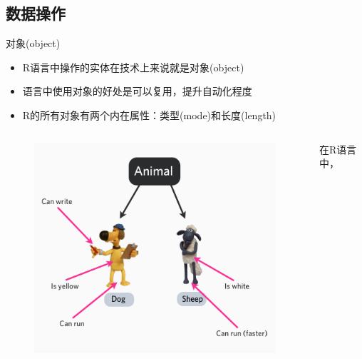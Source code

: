 \documentclass{beamerthemeMono}
\begin{document}
\subsection{数据操作}
\begin{frame}[t]{\subsecname}{对象(object)}
  \begin{itemize}
  \item R语言中操作的实体在技术上来说就是对象(object) 
  \item 语言中使用对象的好处是可以复用，提升自动化程度
  \item R的所有对象有两个内在属性：类型(mode)和长度(length)
  \end{itemize}

  \begin{columns}
    \begin{column}{.5\textwidth}
      \begin{figure}
        \centering \includegraphics[width=\columnwidth]{object.png}
      \end{figure}
    \end{column}

    \begin{column}{.48\textwidth}
      \begin{ornamentblock}
        \centering
        {在R语言中，}
      \end{ornamentblock}
    \end{column}
  \end{columns}
\end{frame}
\end{document}
